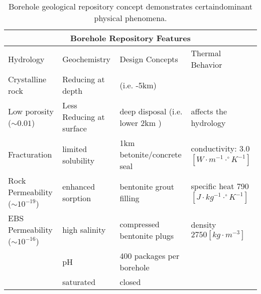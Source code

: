 %
\begin{table}[h!]
  \centering
  \footnotesize{
  \begin{tabular}{|l|l|l|l|}
    \multicolumn{4}{c}{\textbf{Borehole Repository Features}}\\
    \hline
    Hydrology & Geochemistry & Design Concepts & Thermal Behavior \\ 
    \hline
    Crystalline rock&Reducing at depth&(i.e. -5km\cite{clayton_generic_2011}) &\\
    Low porosity ($\sim 0.01$)&Less Reducing at surface& deep disposal (i.e. lower 2km \cite{clayton_generic_2011})&affects the hydrology\\
    Fracturation&limited solubility &1km betonite/concrete seal &conductivity: 3.0 $[W\cdot m^{-1}\cdot^\circ K^{-1}]$\\
    Rock Permeability ($\sim 10^{-19}$) &enhanced sorption &bentonite grout filling&specific heat 790 $[J\cdot kg^{-1}\cdot^\circ K^{-1}]$\\
    \gls{EBS} Permeability ($\sim 10^{-16}$) &high salinity&compressed bentonite plugs&density $2750 [kg\cdot m^{-3}]$\\
    &pH&400 packages per borehole&\\
    &saturated&closed&\\
    \hline
  \end{tabular}
  \caption[Borehole Repository Features]{Borehole geological repository 
  concept demonstrates certaindominant physical phenomena. }
  \label{tab:borehole_tab}
  }
\end{table}


